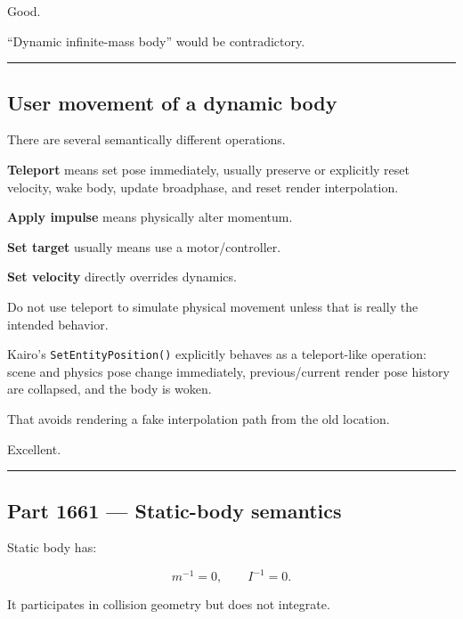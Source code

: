 Good.

``Dynamic infinite-mass body'' would be contradictory.

\begin{center}\rule{0.5\linewidth}{0.5pt}\end{center}

\subsection{User movement of a dynamic body}\label{06-engine-ii-ch037-user-movement-of-a-dynamic-body}

\hypertarget{06-engine-ii-ch037-user-movement-of-a-dynamic-body}{}

There are several semantically different operations.

\textbf{Teleport} means set pose immediately, usually preserve or explicitly reset velocity, wake body, update broadphase, and reset render interpolation.

\textbf{Apply impulse} means physically alter momentum.

\textbf{Set target} usually means use a motor/controller.

\textbf{Set velocity} directly overrides dynamics.

Do not use teleport to simulate physical movement unless that is really the intended behavior.

Kairo's \texttt{SetEntityPosition()} explicitly behaves as a teleport-like operation: scene and physics pose change immediately, previous/current render pose history are collapsed, and the body is woken.

That avoids rendering a fake interpolation path from the old location.

Excellent.

\begin{center}\rule{0.5\linewidth}{0.5pt}\end{center}

\subsection{Part 1661 --- Static-body semantics}\label{06-engine-ii-ch037-part-1661-static-body-semantics}

\hypertarget{06-engine-ii-ch037-part-1661-static-body-semantics}{}

Static body has:

\[
m^{-1}=0,
\qquad
I^{-1}=0.
\]

It participates in collision geometry but does not integrate.


